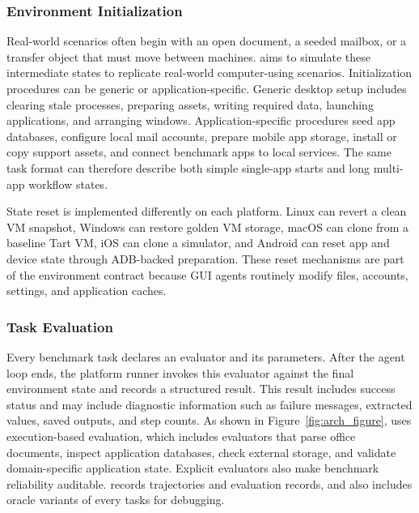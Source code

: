 \subsubsection{Environment Initialization}
\label{init_setup}
Real-world scenarios often begin with an open document, a seeded mailbox, or a transfer object that must move between machines. \dataset aims to simulate these intermediate states to replicate real-world computer-using scenarios. Initialization procedures can be generic or application-specific. Generic desktop setup includes clearing stale processes, preparing assets, writing required data, launching applications, and arranging windows. Application-specific procedures seed app databases, configure local mail accounts, prepare mobile app storage, install or copy support assets, and connect benchmark apps to local services. The same task format can therefore describe both simple single-app starts and long multi-app workflow states.

State reset is implemented differently on each platform. Linux can revert a clean VM snapshot, Windows can restore golden VM storage, macOS can clone from a baseline Tart VM, iOS can clone a simulator, and Android can reset app and device state through ADB-backed preparation. These reset mechanisms are part of the environment contract because GUI agents routinely modify files, accounts, settings, and application caches.

\subsubsection{Task Evaluation}
\label{eval}
Every benchmark task declares an evaluator and its parameters. After the agent loop ends, the platform runner invokes this evaluator against the final environment state and records a structured result. This result includes success status and may include diagnostic information such as failure messages, extracted values, saved outputs, and step counts. As shown in Figure~\ref{fig:arch_figure}, \dataset uses execution-based evaluation, which includes evaluators that parse office documents, inspect application databases, check external storage, and validate domain-specific application state. Explicit evaluators also make benchmark reliability auditable. \dataset records trajectories and evaluation records, and also includes oracle variants of every tasks for debugging.

